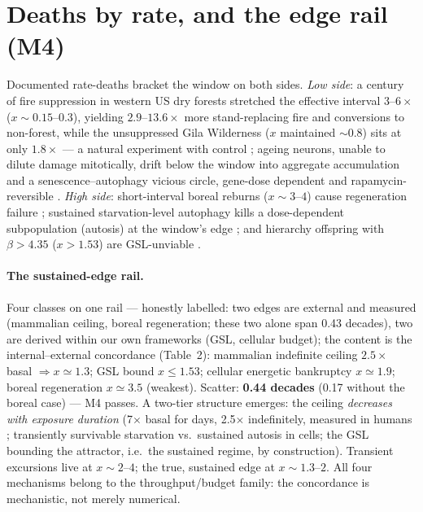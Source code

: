 \documentclass[11pt]{article}
\begin{document}
\section{Deaths by rate, and the edge rail (M4)}
Documented rate-deaths bracket the window on both sides. \emph{Low side}: a century of fire
suppression in western US dry forests stretched the effective interval $3$--$6\times$
($x \sim 0.15$--$0.3$), yielding $2.9$--$13.6\times$ more stand-replacing fire and conversions
to non-forest, while the unsuppressed Gila Wilderness ($x$ maintained $\sim$0.8) sits at only
$1.8\times$ --- a natural experiment with control \cite{Parks2023}; ageing neurons, unable to
dilute damage mitotically, drift below the window into aggregate accumulation and a
senescence--autophagy vicious circle, gene-dose dependent and rapamycin-reversible
\cite{Neuron2024}. \emph{High side}: short-interval boreal reburns ($x \sim 3$--$4$) cause
regeneration failure \cite{Boreal2025}; sustained starvation-level autophagy kills a
dose-dependent subpopulation (autosis) at the window's edge \cite{Liu2013}; and hierarchy
offspring with $\beta > 4.35$ ($x > 1.53$) are GSL-unviable \cite{PaperB}.

\paragraph{The sustained-edge rail.} Four classes on one rail --- honestly labelled: two edges are external and measured (mammalian ceiling, boreal regeneration; these two alone span 0.43 decades), two are derived within our own frameworks (GSL, cellular budget); the content is the internal--external concordance
(Table~2): mammalian indefinite ceiling $2.5\times$ basal \cite{Thurber2019,HD1997,DrentDaan}
$\Rightarrow x \simeq 1.3$; GSL bound $x \le 1.53$; cellular energetic bankruptcy $x \simeq 1.9$;
boreal regeneration $x \simeq 3.5$ (weakest). Scatter: \textbf{0.44 decades} (0.17 without the
boreal case) --- M4 passes. A two-tier structure emerges: the ceiling \emph{decreases with
exposure duration} (7$\times$ basal for days, 2.5$\times$ indefinitely, measured in humans
\cite{Thurber2019}; transiently survivable starvation vs.\ sustained autosis in cells; the GSL
bounding the attractor, i.e.\ the sustained regime, by construction). Transient excursions live
at $x \sim 2$--$4$; the true, sustained edge at $x \sim 1.3$--$2$. All four mechanisms belong to
the throughput/budget family: the concordance is mechanistic, not merely numerical.
\end{document}
